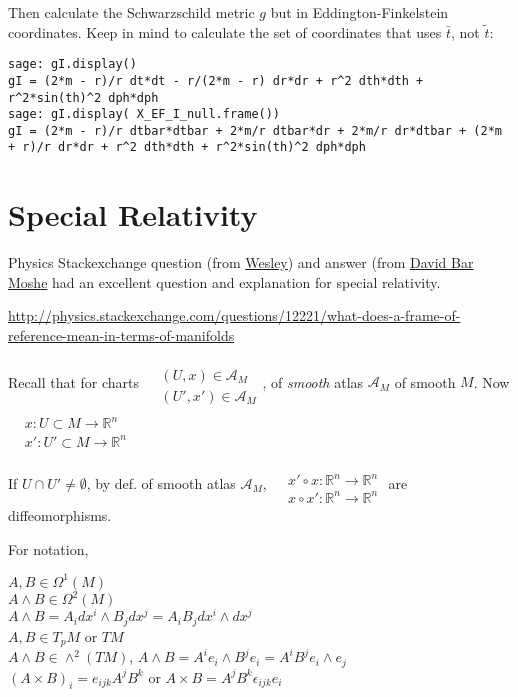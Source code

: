 \documentclass[10pt, twoside]{amsart}
\begin{document}
\begin{multicols*}{2}
Then calculate the Schwarzschild metric $g$ but in Eddington-Finkelstein coordinates.  Keep in mind to calculate the set of coordinates that uses $\bar{t}$, not $\widetilde{t}$: 

\begin{lstlisting}[frame=single]
sage: gI.display()
gI = (2*m - r)/r dt*dt - r/(2*m - r) dr*dr + r^2 dth*dth + r^2*sin(th)^2 dph*dph
sage: gI.display( X_EF_I_null.frame())
gI = (2*m - r)/r dtbar*dtbar + 2*m/r dtbar*dr + 2*m/r dr*dtbar + (2*m + r)/r dr*dr + r^2 dth*dth + r^2*sin(th)^2 dph*dph
\end{lstlisting}



\part{Special Relativity}

Physics Stackexchange question (from \href{http://physics.stackexchange.com/users/4249/wesley}{Wesley}) and answer (from \href{http://physics.stackexchange.com/users/2190/david-bar-moshe}{David Bar Moshe} had an excellent question and explanation for special relativity.  

\url{http://physics.stackexchange.com/questions/12221/what-does-a-frame-of-reference-mean-in-terms-of-manifolds}



Recall that for charts $\begin{aligned} & \quad \\
  & (U,x) \in \mathcal{A}_M \\
  & (U',x') \in \mathcal{A}_M \end{aligned}$, of \emph{smooth} atlas $\mathcal{A}_M$ of smooth $M$.  Now $\begin{aligned} & \quad \\
  & x : U \subset M \to \mathbb{R}^n \\
  & x':U' \subset M \to \mathbb{R}^n \end{aligned}$ 

If $U \cap U'\neq \emptyset$, by def. of smooth atlas $\mathcal{A}_M$, $\begin{aligned} & \quad \\
  & x'\circ x : \mathbb{R}^n \to \mathbb{R}^n \\
  & x\circ x' : \mathbb{R}^n \to \mathbb{R}^n \end{aligned}$ are diffeomorphisms.

For notation, 


$A,B \in \Omega^1(M)$ \\
$A \wedge B \in \Omega^2(M)$ \\
$A\wedge B = A_i dx^i \wedge B_j dx^j =A_iB_j dx^i \wedge dx^j$  \\
$A,B \in T_pM$ or $TM$ \\
$A \wedge B \in \wedge^2(TM)$, $A\wedge B = A^i e_i \wedge B^j e_i = A^i B^j e_i \wedge e_j$ \\
$(A\times B)_i = e_{ijk} A^j B^k$ or $A\times B = A^j B^k \epsilon_{ijk} e_i$


\end{multicols*}
\end{document}
